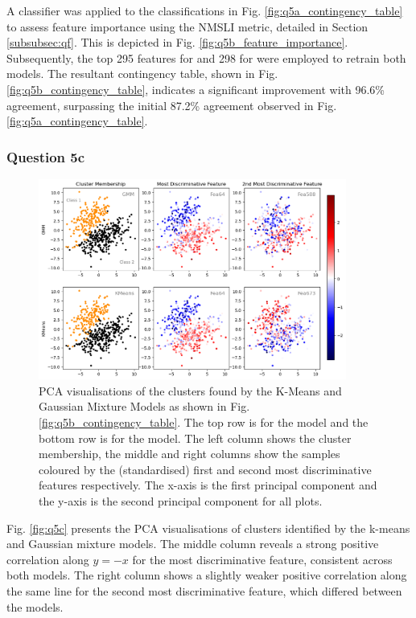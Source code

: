     A  classifier was applied to the classifications in Fig. \eqref{fig:q5a_contingency_table} to
    assess feature importance using the NMSLI metric, detailed in Section \eqref{subsubsec:qf}.
    This is depicted in Fig. \eqref{fig:q5b_feature_importance}.
    Subsequently, the top 295 features for  and 298 for  were employed to
    retrain both models.
    The resultant contingency table, shown in Fig. \eqref{fig:q5b_contingency_table}, indicates a significant improvement
    with 96.6\% agreement, surpassing the initial 87.2\% agreement observed in Fig. \eqref{fig:q5a_contingency_table}.

\subsubsection{Question 5c}\label{subsubsec:q5c}
    \begin{figure}[htb]
    \centering
    \includegraphics[width=0.9\textwidth]{./figures/q5c}
    \caption{PCA visualisations of the clusters found by the K-Means and Gaussian Mixture Models as shown in Fig.
        \eqref{fig:q5b_contingency_table}. The top row is for the  model and the bottom row is for the  model.
        The left column shows the cluster membership, the middle and right columns show the samples coloured by the
        (standardised) first and second most discriminative features respectively. The x-axis is the first principal
        component and the y-axis is the second principal component for all plots.}
    \label{fig:q5c}
    \end{figure}

    Fig. \eqref{fig:q5c} presents the PCA visualisations of clusters identified by the k-means and Gaussian mixture models.
    The middle column reveals a strong positive correlation along $y=-x$ for the most discriminative feature, consistent across
    both models.
    The right column shows a slightly weaker positive correlation along the same line for the second most
    discriminative feature, which differed between the models.
